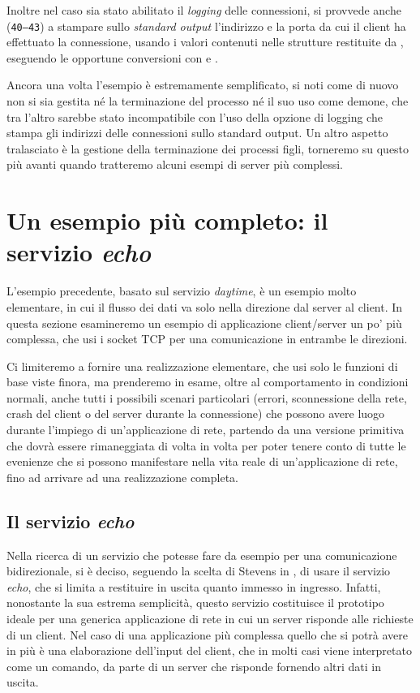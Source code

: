 Inoltre nel caso sia stato abilitato il \textit{logging} delle connessioni, si
provvede anche (\texttt{\small 40--43}) a stampare sullo \textit{standard
  output} l'indirizzo e la porta da cui il client ha effettuato la
connessione, usando i valori contenuti nelle strutture restituite da
, eseguendo le opportune conversioni con  e
.

Ancora una volta l'esempio è estremamente semplificato, si noti come di nuovo
non si sia gestita né la terminazione del processo né il suo uso come demone,
che tra l'altro sarebbe stato incompatibile con l'uso della opzione di logging
che stampa gli indirizzi delle connessioni sullo standard output. Un altro
aspetto tralasciato è la gestione della terminazione dei processi figli,
torneremo su questo più avanti quando tratteremo alcuni esempi di server più
complessi.


\section{Un esempio più completo: il servizio \textit{echo}}
\label{sec:TCP_echo_application}

L'esempio precedente, basato sul servizio \textit{daytime}, è un esempio molto
elementare, in cui il flusso dei dati va solo nella direzione dal server al
client. In questa sezione esamineremo un esempio di applicazione client/server
un po' più complessa, che usi i socket TCP per una comunicazione in entrambe
le direzioni.

Ci limiteremo a fornire una realizzazione elementare, che usi solo le funzioni
di base viste finora, ma prenderemo in esame, oltre al comportamento in
condizioni normali, anche tutti i possibili scenari particolari (errori,
sconnessione della rete, crash del client o del server durante la connessione)
che possono avere luogo durante l'impiego di un'applicazione di rete, partendo
da una versione primitiva che dovrà essere rimaneggiata di volta in volta per
poter tenere conto di tutte le evenienze che si possono manifestare nella vita
reale di un'applicazione di rete, fino ad arrivare ad una realizzazione
completa.


\subsection{Il servizio \textit{echo}}
\label{sec:TCP_echo}

Nella ricerca di un servizio che potesse fare da esempio per una comunicazione
bidirezionale, si è deciso, seguendo la scelta di Stevens in \cite{UNP1}, di
usare il servizio \textit{echo}, che si limita a restituire in uscita quanto
immesso in ingresso. Infatti, nonostante la sua estrema semplicità, questo
servizio costituisce il prototipo ideale per una generica applicazione di rete
in cui un server risponde alle richieste di un client.  Nel caso di una
applicazione più complessa quello che si potrà avere in più è una elaborazione
dell'input del client, che in molti casi viene interpretato come un comando,
da parte di un server che risponde fornendo altri dati in uscita.

